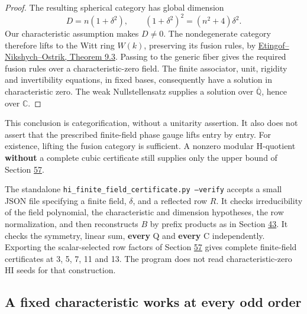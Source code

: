 \documentclass[11pt,reqno]{amsart}
\theoremstyle{plain}
\begin{document}
\begin{proof}
The resulting spherical category has global dimension
\begin{equation*}
 D=n(1+\delta^2),\qquad
 (1+\delta^2)^2=(n^2+4)\delta^2.
 \tag{58.3}
\end{equation*}
Our characteristic assumption makes \(D\ne0\). The nondegenerate
category therefore lifts to the Witt ring \(W(k)\), preserving its
fusion rules, by \href{https://annals.math.princeton.edu/wp-content/uploads/annals-v162-n2-p01.pdf}{Etingof--Nikshych--Ostrik, Theorem 9.3}.
Passing to the generic fiber gives the required fusion rules over a
characteristic-zero field. The finite associator, unit, rigidity and
invertibility equations, in fixed bases, consequently have a solution
in characteristic zero. The weak Nullstellensatz supplies a solution
over \(\overline{\mathbb Q}\), hence over \(\mathbb C\).
\end{proof}

This conclusion is categorification, without a unitarity assertion.
It also does not assert that the prescribed finite-field phase gauge
lifts entry by entry. For existence, lifting the fusion category is
sufficient. A nonzero modular H-quotient \textbf{without} a complete cubic
certificate still supplies only the upper bound of Section \hyperref[sec:57]{57}.

The standalone \texttt{hi\_\allowbreak finite\_\allowbreak field\_\allowbreak certificate.py --verify} accepts a
small JSON file specifying a finite field, \(\delta\), and a reflected
row \(R\). It checks irreducibility of the field polynomial, the
characteristic and dimension hypotheses, the row normalization, and
then reconstructs \(B\) by prefix products as in Section \hyperref[sec:43]{43}. It checks
the symmetry, linear sum, \textbf{every} Q and \textbf{every} C independently.
Exporting the scalar-selected row factors of Section \hyperref[sec:57]{57} gives complete
finite-field certificates at 3, 5, 7, 11 and 13. The program does not
read characteristic-zero HI seeds for that construction.

\subsection{A fixed characteristic works at every odd order}\label{sec:58.2}
\end{document}

